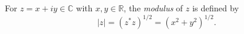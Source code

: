 For $z = x + iy \in \mathbb{C}$ with $x, y \in \mathbb{R}$, the \textit{modulus} of $z$ is defined by
\begin{equation*}
|z| = (z^* z)^{1/2} = (x^2 + y^2)^{1/2}.
\end{equation*}

